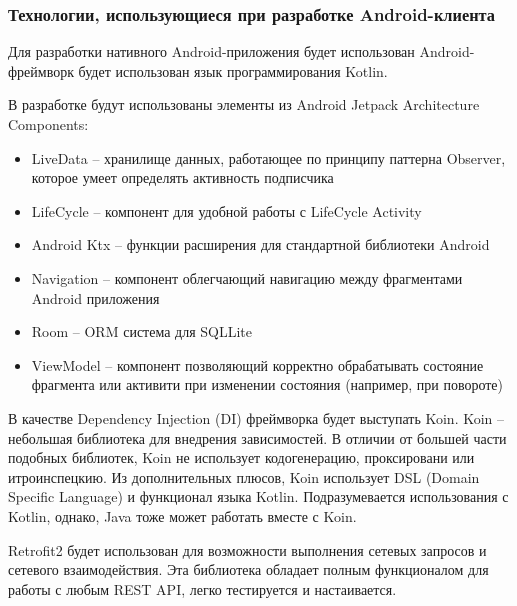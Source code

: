 
\subsubsection{Технологии, использующиеся при разработке Android-клиента}\indent

Для разработки нативного Android-приложения будет использован Android-фреймворк будет использован язык программирования Kotlin.

В разработке будут использованы элементы из Android Jetpack Architecture Components:
\begin{itemize}
    \item LiveData – хранилище данных, работающее по принципу паттерна Observer, которое умеет определять активность подписчика
    \item LifeCycle – компонент для удобной работы с LifeCycle Activity
    \item Android Ktx – функции расширения для стандартной библиотеки Android
    \item Navigation – компонент облегчающий навигацию между фрагментами Android приложения
    \item Room – ORM система для SQLLite
    \item ViewModel – компонент позволяющий корректно обрабатывать состояние фрагмента или активити при изменении состояния (например, при повороте)
\end{itemize}

В качестве Dependency Injection (DI) фреймворка будет выступать Koin.
Koin – небольшая библиотека для внедрения зависимостей.
В отличии от большей части подобных библиотек, Koin не использует кодогенерацию, проксировани или итроинспецкию.
Из дополнительных плюсов, Koin использует DSL (Domain Specific Language) и функционал языка Kotlin.
Подразумевается использования с Kotlin, однако, Java тоже может работать вместе с Koin.

Retrofit2 будет использован для возможности выполнения сетевых запросов и сетевого взаимодействия.
Эта библиотека обладает полным функционалом для работы с любым REST API, легко тестируется и настаивается.
